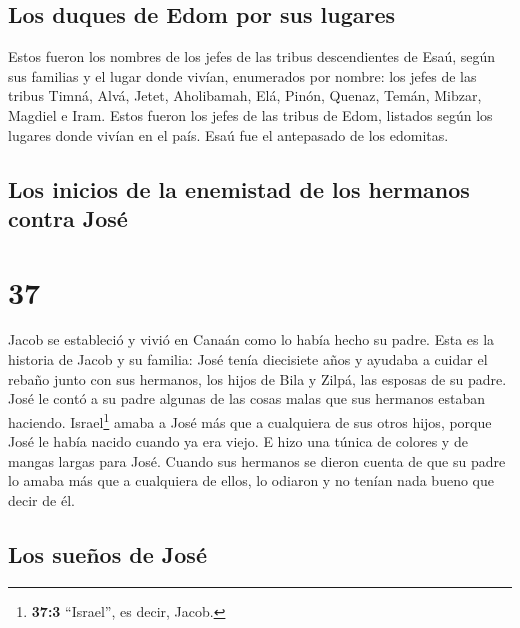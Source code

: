 \hypertarget{los-duques-de-edom-por-sus-lugares}{%
\subsection{Los duques de Edom por sus
lugares}\label{los-duques-de-edom-por-sus-lugares}}

 Estos fueron los nombres de los jefes de las tribus
descendientes de Esaú, según sus familias y el lugar donde vivían,
enumerados por nombre: los jefes de las tribus Timná, Alvá, Jetet,
 Aholibamah, Elá, Pinón,  Quenaz, Temán,
Mibzar,  Magdiel e Iram. Estos fueron los jefes de las
tribus de Edom, listados según los lugares donde vivían en el país. Esaú
fue el antepasado de los edomitas.

\hypertarget{los-inicios-de-la-enemistad-de-los-hermanos-contra-josuxe9}{%
\subsection{Los inicios de la enemistad de los hermanos contra
José}\label{los-inicios-de-la-enemistad-de-los-hermanos-contra-josuxe9}}

\hypertarget{section-36}{%
\section{37}\label{section-36}}

 Jacob se estableció y vivió en Canaán como lo había hecho
su padre.  Esta es la historia de Jacob y su familia: José
tenía diecisiete años y ayudaba a cuidar el rebaño junto con sus
hermanos, los hijos de Bila y Zilpá, las esposas de su padre. José le
contó a su padre algunas de las cosas malas que sus hermanos estaban
haciendo.  Israel\footnote{\textbf{37:3} ``Israel'', es
  decir, Jacob.} amaba a José más que a cualquiera de sus otros hijos,
porque José le había nacido cuando ya era viejo. E hizo una túnica de
colores y de mangas largas para José.  Cuando sus hermanos
se dieron cuenta de que su padre lo amaba más que a cualquiera de ellos,
lo odiaron y no tenían nada bueno que decir de él.

\hypertarget{los-sueuxf1os-de-josuxe9}{%
\subsection{Los sueños de José}\label{los-sueuxf1os-de-josuxe9}}

